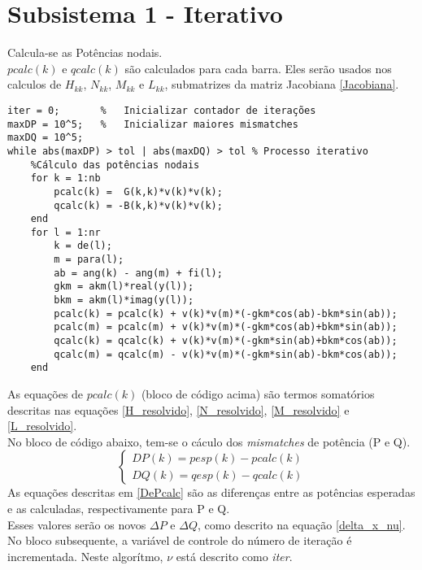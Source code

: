 \section{Subsistema 1 - Iterativo}
Calcula-se as Potências nodais.\\
$pcalc(k)$ e $qcalc(k)$ são calculados para cada barra. Eles serão usados nos calculos de $H_{kk}$, $N_{kk}$, $M_{kk}$ e $L_{kk}$, submatrizes da matriz Jacobiana \ref{Jacobiana}.\\
\begin{verbatim}
iter = 0;       %	Inicializar contador de iterações
maxDP = 10^5;   %	Inicializar maiores mismatches
maxDQ = 10^5;   
while abs(maxDP) > tol | abs(maxDQ) > tol %	Processo iterativo 
    %Cálculo das potências nodais
    for k = 1:nb
        pcalc(k) =  G(k,k)*v(k)*v(k);
        qcalc(k) = -B(k,k)*v(k)*v(k);
    end
    for l = 1:nr
        k = de(l);
        m = para(l);
        ab = ang(k) - ang(m) + fi(l);
        gkm = akm(l)*real(y(l));
        bkm = akm(l)*imag(y(l));
        pcalc(k) = pcalc(k) + v(k)*v(m)*(-gkm*cos(ab)-bkm*sin(ab));
        pcalc(m) = pcalc(m) + v(k)*v(m)*(-gkm*cos(ab)+bkm*sin(ab));
        qcalc(k) = qcalc(k) + v(k)*v(m)*(-gkm*sin(ab)+bkm*cos(ab));
        qcalc(m) = qcalc(m) - v(k)*v(m)*(-gkm*sin(ab)-bkm*cos(ab));
    end
\end{verbatim}
As equações de $pcalc(k)$ (bloco de código acima) são termos somatórios descritas nas equações \ref{H_resolvido}, \ref{N_resolvido}, \ref{M_resolvido} e \ref{L_resolvido}.\\
No bloco de código abaixo, tem-se o cáculo dos \textit{mismatches} de potência (P e Q).
\begin{equation}
\left\{    \begin{array}{lll}
                DP(k)=pesp(k)-pcalc(k)\\
                DQ(k)=qesp(k)-qcalc(k)
            \end{array}\right.
    \label{DePcalc}
\end{equation}
As equações descritas em \ref{DePcalc} são as diferenças entre as potências esperadas e as calculadas, respectivamente para P e Q.\\
Esses valores serão os novos $\Delta P$ e $\Delta Q$, como descrito na equação \ref{delta_x_nu}.\\
No bloco subsequente, a variável de controle do número de iteração é incrementada. Neste algorítmo, $\nu$ está descrito como \textit{iter}.\\
